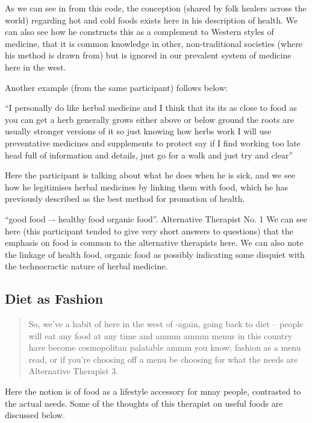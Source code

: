 As we can see in from this code, the conception (shared by folk healers across the world) regarding hot and cold foods exists here in his description of health. We can also see how he constructs this as a complement to Western styles of medicine, that it is common knowledge in other, non-traditional societies (where his method is drawn from) but is ignored in our prevalent system of medicine here in the west. 

Another example (from the same participant) follows below:

``I personally do like herbal medicine and I think that its its as close to food as you can get a herb generally grows either above or below ground the roots are usually stronger versions of it so just knowing how herbs work I will use preventative medicines and supplements to protect say if I find working too late head full of information and details, just go for a walk and just try and clear''

Here the participant is talking about what he does when he is sick, and we see how he legitimises herbal medicines by linking them with food, which he has previously described as the best method for promotion of health. 

``good food –- healthy food organic food''. Alternative Therapist No. 1
We can see here (this participant tended to give very short answers to questions) that the emphasis on food is common to the alternative therapists here. We can also note the linkage of health food, organic food as possibly indicating some disquiet with the technocractic nature of herbal medicine. 

\subsection{Diet as Fashion}
\label{sec:diet-as-fashion}

\begin{quotation}
  So, we've a habit of here in the west of -again, going back to diet – people will eat any food at any time and ammm ammm menus in this country have become cosmopolitan palatable ammm you know, fashion as a menu read, or if you're choosing off  a menu be choosing for what the needs are
Alternative Therapist 3. 
\end{quotation}

Here the notion is of food as a lifestyle accessory for mnay people, contrasted to the actual needs. Some of the thoughts of this therapist on useful foods are discussed below. 

